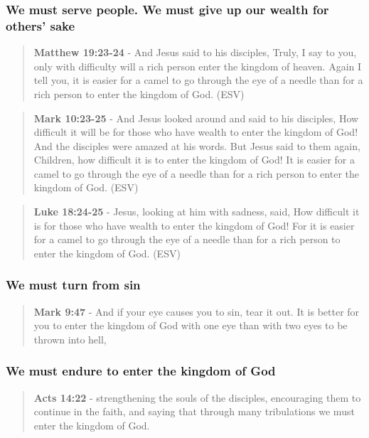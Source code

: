 \documentclass[11pt]{article}
\begin{document}
\subsubsection{We must serve people. We must give up our wealth for others' sake}
\label{sec:org5a2cf74}
\begin{quote}
\textbf{Matthew 19:23-24} - And Jesus said to his disciples, Truly, I say to you, only with difficulty will a rich person enter the kingdom of heaven. Again I tell you, it is easier for a camel to go through the eye of a needle than for a rich person to enter the kingdom of God. (ESV)
\end{quote}

\begin{quote}
\textbf{Mark 10:23-25} - And Jesus looked around and said to his disciples, How difficult it will be for those who have wealth to enter the kingdom of God! And the disciples were amazed at his words. But Jesus said to them again, Children, how difficult it is to enter the kingdom of God! It is easier for a camel to go through the eye of a needle than for a rich person to enter the kingdom of God. (ESV)
\end{quote}

\begin{quote}
\textbf{Luke 18:24-25} - Jesus, looking at him with sadness, said, How difficult it is for those who have wealth to enter the kingdom of God! For it is easier for a camel to go through the eye of a needle than for a rich person to enter the kingdom of God. (ESV)
\end{quote}

\subsubsection{We must turn from sin}
\label{sec:orge3051a1}
\begin{quote}
\textbf{Mark 9:47} - And if your eye causes you to sin, tear it out. It is better for you to enter the kingdom of God with one eye than with two eyes to be thrown into hell,
\end{quote}

\subsubsection{We must endure to enter the kingdom of God}
\label{sec:orgbae6bc2}
\begin{quote}
\textbf{Acts 14:22} - strengthening the souls of the disciples, encouraging them to continue in the faith, and saying that through many tribulations we must enter the kingdom of God.
\end{quote}
\end{document}
